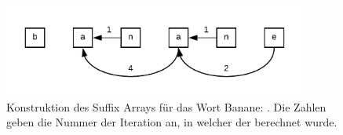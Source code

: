 




\begin{figure}
	\begin{minipage}[H]{10cm}
		\centering
		\includegraphics[width=10cm]{kapitel/saca_algorithmen/gsaca/images/Banane-prev-pointer}
	\end{minipage}
	\caption[Konstruktion des Suffix Arrays für das Wort Banane: \prevpointer]{Konstruktion des Suffix Arrays für das Wort Banane: \prevpointer. Die Zahlen geben die Nummer der Iteration an, in welcher der \prevpointer berechnet wurde.}
\label{fig_banane_prev_pointer}
\end{figure}







%